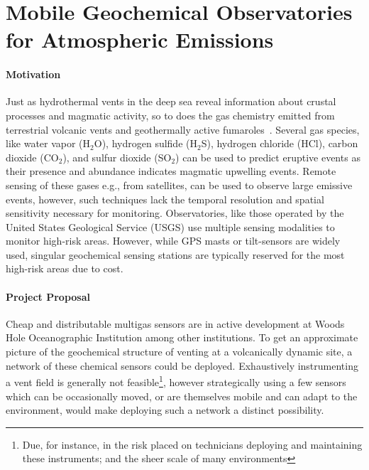 \section{Mobile Geochemical Observatories for Atmospheric Emissions}
\paragraph{Motivation}
Just as hydrothermal vents in the deep sea reveal information about crustal processes and magmatic activity, so to does the gas chemistry emitted from terrestrial volcanic vents and geothermally active fumaroles~\autocite{mcgonigle2008unmanned,smith2009volcano,fischer2015temporal}.
Several gas species, like water vapor (H$_2$O), hydrogen sulfide (H$_2$S), hydrogen chloride (HCl), carbon dioxide (CO$_2$), and sulfur dioxide (SO$_2$) can be used to predict eruptive events\autocite{smith2009volcano,fischer2015temporal,fischer2019explosions,hernandez2001carbon} as their presence and abundance indicates magmatic upwelling events.
Remote sensing of these gases e.g., from satellites, can be used to observe large emissive events, however, such techniques lack the temporal resolution and spatial sensitivity necessary for monitoring\autocite{mcgonigle2008unmanned}.
Observatories, like those operated by the United States Geological Service (USGS) use multiple sensing modalities to monitor high-risk areas\autocite{usgs2019}.
However, while GPS masts or tilt-sensors are widely used, singular geochemical sensing stations are typically reserved for the most high-risk areas due to cost\autocite{smith2009volcano}.

\paragraph{Project Proposal}
Cheap and distributable multigas sensors are in active development at Woods Hole Oceanographic Institution among other institutions\autocite{kaliszewski2021multi,stix2018using,galle2021multi}.
To get an approximate picture of the geochemical structure of venting at a volcanically dynamic site, a network of these chemical sensors could be deployed. Exhaustively instrumenting a vent field is generally not feasible\footnote{Due, for instance, in the risk placed on technicians deploying and maintaining these instruments; and the sheer scale of many environments}, however strategically using a few sensors which can be occasionally moved, or are themselves mobile and can adapt to the environment, would make deploying such a network a distinct possibility.

